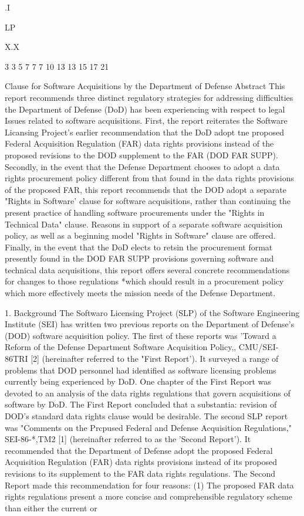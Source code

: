 \documentclass[12pt]{article}
\begin{document}
.I

LP%

X.X

3
3
5
7
7
7
10
13
13
15
17
21

Clause for Software Acquisitions by the
Department of Defense
Abstract
This report recommends three distinct regulatory strategies for addressing difficulties the
Department of Defense (DoD) has been experiencing with respect to legal Issues related
to software acquisitions. First, the report reiterates the Software Licansing Project's earlier recommendation that the DoD adopt tne proposed Federal Acquisition Regulation
(FAR) data rights provisions instead of the proposed revisions to the DOD supplement to
the FAR (DOD FAR SUPP).
Secondly, in the event that the Defense Department chooses to adopt a data rights
procurement policy different from that found in the data rights provisions of the proposed
FAR, this report recommends that the DOD adopt a separate "Rights in Software' clause
for software acquisitions, rather than continuing the present practice of handling software
procurements under the "Rights in Technical Data" clause. Reasons in support of a
separate software acquisition policy, as well as a beginning model "Rights in Software"
clause are offered.
Finally, in the event that the DoD elects to retsin the procurement format presently found
in the DOD FAR SUPP provisions governing software and technical data acquisitions,
this report offers several concrete recommendations for changes to those regulations
*which
should result in a procurement policy which more effectively meets the mission
needs of the Defense Department.

1. Background
The Softwaro Licensing Project (SLP) of the Software Engineering Institute (SEI) has written two
previous reports on the Department of Defense's (DOD) software acquisition policy. The first of these
reports was 'Toward a Reform of the Defense Department Software Acquisition Policy,, CMU/SEI-86TRI [2] (hereinafter referred to the "First Report'). It surveyed a range of problems that DOD personnel had identified as software licensing problems currently being experienced by DoD. One chapter
of the First Report was devoted to an analysis of the data rights regulations that govern acquisitions
of software by DoD. The First Report concluded that a substantia: revision of DOD's standard data
rights clause would be desirable.
The second SLP report was "Comments on the Prcpused Federal and Defense Acquisition
Regulations," SEI-86-*,TM2 [1] (hereinafter referred to as the 'Second Report'). It recommended that
the Department of Defense adopt the proposed Federal Acquisition Regulation (FAR) data rights
provisions instead of its proposed revisions to its supplement to the FAR data rights regulations. The
Second Report made this recommendation for four reasons: (1) The proposed FAR data rights
regulations present a more concise and comprehensible regulatory scheme than either the current or
\end{document}
